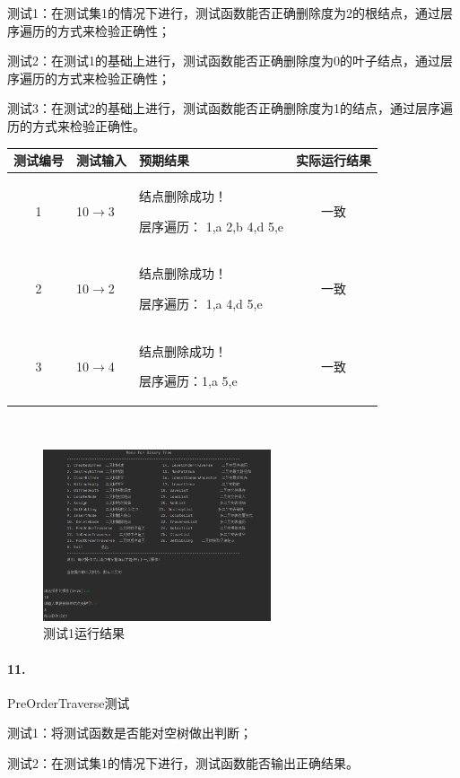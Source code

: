 \documentclass[supercite]{Experimental_Report}
\theoremstyle{definition}
\begin{document}
测试1：在测试集1的情况下进行，测试函数能否正确删除度为2的根结点，通过层序遍历的方式来检验正确性；

测试2：在测试1的基础上进行，测试函数能否正确删除度为0的叶子结点，通过层序遍历的方式来检验正确性；

测试3：在测试2的基础上进行，测试函数能否正确删除度为1的结点，通过层序遍历的方式来检验正确性。

\vspace{0.5em}

\begin{tabular}{|c|l|l|c|}
	\hline
	测试编号 & 测试输入 & 预期结果 & 实际运行结果 \\
	\hline
	1 & 10$\rightarrow$3& 结点删除成功！

层序遍历： 1,a 2,b 4,d 5,e & 一致 \\
	\hline
	2 & 10$\rightarrow$2& 结点删除成功！

层序遍历： 1,a 4,d 5,e & 一致 \\
	\hline
	3 & 10$\rightarrow$4 & 结点删除成功！

层序遍历：1,a 5,e & 一致 \\
	\hline
\end{tabular}

~\

\begin{figure}[H]
 	\centering
 	\includegraphics[width=0.6\textwidth]{images/二叉树测试10.png}
 	\caption{测试1运行结果}
 	\label{txlab}
 \end{figure}

\paragraph{11.}PreOrderTraverse测试

测试1：将测试函数是否能对空树做出判断；

测试2：在测试集1的情况下进行，测试函数能否输出正确结果。

\vspace{0.5em}
\end{document}
